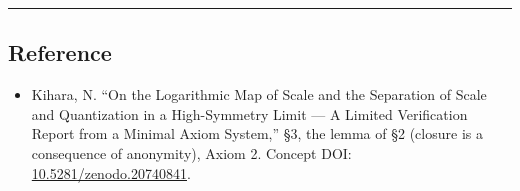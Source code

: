\documentclass[11pt]{ltjsarticle}
\providecommand{\tightlist}{\setlength{\itemsep}{0pt}\setlength{\parskip}{0pt}}
\begin{document}
\begin{center}\rule{0.5\linewidth}{0.5pt}\end{center}

\subsection{Reference}\label{reference}

\begin{itemize}
\tightlist
\item
  Kihara, N. ``On the Logarithmic Map of Scale and the Separation of
  Scale and Quantization in a High-Symmetry Limit --- A Limited
  Verification Report from a Minimal Axiom System,'' §3, the lemma of §2
  (closure is a consequence of anonymity), Axiom 2. Concept DOI:
  \href{https://doi.org/10.5281/zenodo.20740841}{10.5281/zenodo.20740841}.
\end{itemize}
\end{document}

